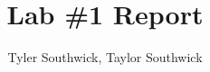 \documentclass[11pt]{article}
\begin{document}
\title{Lab \#1 Report}

\author{Tyler Southwick, Taylor Southwick}

\date{}

\maketitle
\end{document}
